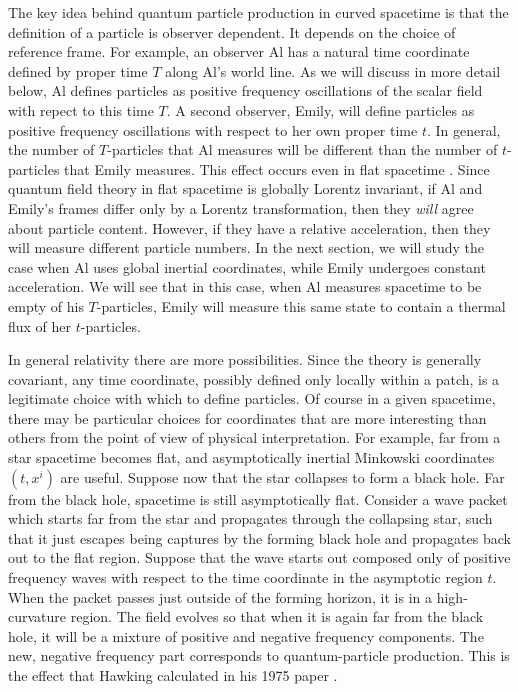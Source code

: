 \documentclass[12pt]{article}
\begin{document}
The key idea behind quantum particle production in curved spacetime is
that the definition of a particle is observer dependent.  It depends
on the choice of reference frame.  For example, an observer Al has a natural
time coordinate defined by proper time $T$ along Al's world line.
As we will discuss in more detail below, Al defines
particles as positive frequency oscillations of the scalar field with
repect to this time
$T$.  A second observer, Emily, will define particles as positive frequency
oscillations with
respect to her own proper time $t$. In general, the number of $T$-particles
that Al measures
will be different than the number of $t$-particles that Emily measures.
This effect occurs even in flat spacetime \cite{fulling,unruh}.
Since quantum field theory in flat spacetime is globally Lorentz invariant,
if Al
and Emily's frames differ only by a Lorentz transformation, then they
{\it will} agree about particle content.  However, if they have a
relative acceleration, then they will measure different particle numbers.
In the next section, we will study the case when Al uses
global inertial coordinates, while Emily undergoes constant acceleration.
We will see that in this case, when Al measures spacetime to be empty of
his $T$-particles,
Emily will measure this same state to contain a thermal flux of her
$t$-particles.

In general relativity there are more possibilities. Since the
theory is generally covariant, any time coordinate, possibly defined only
locally within a
patch, is a legitimate choice with which to define particles.  Of course in
a given
spacetime, there may be particular choices for coordinates that are more
interesting than
others from the point of view of physical interpretation. For example, far
from a star
spacetime becomes flat, and asymptotically inertial Minkowski
coordinates $(t, x^i )$ are useful.  Suppose now that the star collapses to form a black
hole.  Far from the black hole, spacetime is still asymptotically flat.
Consider a wave packet which starts far from the star and
propagates through the collapsing star,
such that it just escapes being captures by the forming black hole and
propagates back out
to the flat region.
Suppose that the wave starts out composed only of positive frequency
waves with respect to the time coordinate in the asymptotic region $t$.
When the packet
passes just outside of the forming horizon, it is in a high-curvature
region.  The field
evolves so that when it is again far from the black hole, it will be a
mixture of positive
and negative frequency components. The new, negative frequency part
corresponds to
quantum-particle production. This is the effect that Hawking calculated in
his 1975 paper
\cite{hawking}.
\end{document}
